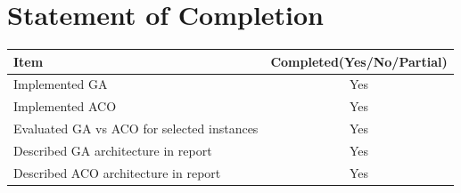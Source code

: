 \documentclass[11pt,a4paper,final]{article}
\begin{document}
	\section{Statement of Completion}
	\label{SoC}
	\begin{table}[H]
		\centering
		\begin{tabular}{|l|c|}
			\hline
			\textbf{Item} & \textbf{Completed(Yes/No/Partial)}\\
			\hline
			\hline
			Implemented GA & Yes\\\hline
			Implemented ACO & Yes\\\hline
			Evaluated GA vs ACO for selected instances & Yes\\\hline
			Described GA architecture in report & Yes\\\hline
			Described ACO architecture in report & Yes\\\hline
		\end{tabular}
	\end{table}
	\pagebreak
	
\end{document}
